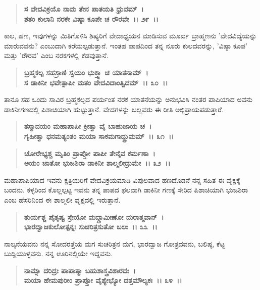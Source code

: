 \begin{verse}
\textbf{ಸ ವೇದವಿಕ್ರಯೊ ನಾಮ ತೇನ ಪಾತಯತಿ ಧ್ರುವಮ್~।}\\\textbf{ಶತಂ ಕುಲಾನಿ ನರಕೇ ವಿಷ್ಠಾ ಕೂಪೇ ಚ ರೌರವೇ~।। ೨೯~।।}
\end{verse}

ಕಾಲ, ಹಣ, ಇವುಗಳನ್ನು ಮಿತಿಗೊಳಿಸಿ ಶಿಷ್ಯರಿಗೆ ವೇದಾಧ್ಯಯನ ಮಾಡಿಸುವ ಮೂರ್ಖ ಬ್ರಾಹ್ಮಣನು 'ವೇದವಿದ್ಯೆಯನ್ನು ಮಾರುವವನು? ಎಂಬುದಾಗಿ ಕರೆಯಲ್ಪಡುತ್ತಾನೆ. ಇಂತಹ ಪಾಪದಿಂದ ತನ್ನ ನೂರು ಕುಲದವರನ್ನು, 'ವಿಷ್ಠಾ ಕೂಪ' ಮತ್ತು 'ರೌರವ' ಎಂಬ ನರಕಗಳಲ್ಲಿ ಕೆಡವುತ್ತಾನೆ.

\begin{verse}
\textbf{ಬ್ರಹ್ಮಕಲ್ಪ ಸಹಸ್ರಾಣಿ ಸ್ವಯಂ ಭುಕ್ತ್ವಾ ಚ ಯಾತನಾಮ್~।}\\\textbf{ಸ ಡಾಕಿನೀ ಭವೇತ್ಪಾಪೀ ಮತಂ ವೇದವಿದಾಂತ್ವಿದಮ್~।। ೩೦~।।}
\end{verse}

ತಾನೂ ಸಹ ಒಂದು ಸಾವಿರ ಬ್ರಹ್ಮಕಲ್ಪದ ಪರ್ಯಂತ ನರಕ ಯಾತನೆಯನ್ನು ಅನುಭವಿಸಿ ನಂತರ ಪಾಪಿಯಾದ ಅವನು ಡಾಕಿನೀಗಣದಲ್ಲಿ ಪಿಶಾಚಿಯಾಗಿ ಹುಟ್ಟುತ್ತಾನೆ. ವೇದಗಳನ್ನು ಬಲ್ಲವರು ಈ ರೀತಿ ಅಭಿಪ್ರಾಯಪಡುತ್ತಾರೆ.

\begin{verse}
\textbf{ತಸ್ಮಾದಯಂ ಮಹಾಪಾಪೀ ಕ್ರೀತ್ವಾ ವೈ ಬಾಹುಜಾಯ ಚ~।}\\\textbf{ಗೃಹೀತ್ವಾ ಧನಮತ್ಯಂತಂ ಮಯಾ ಸಾಕಮಗಾದ್ದ್ರುಮಮ್~।। ೩೧~।। }
\end{verse}

\begin{verse}
\textbf{ಚೋರೇಭ್ಯಶ್ಚ ಮೃತಿಂ ಪ್ರಾಪ್ತೋ ಪಾಪೀ ತೇನೈವ ಕರ್ಮಣಾ~।}\\\textbf{ಅಯಂ ಜಾತೋ ಭುಜಶಿರಾ ಡಾಕಿನೀ ಶಾಲ್ಮಲೀದ್ರುಮೇ~।। ೩೨~।।}
\end{verse}

ಮಹಾಪಾಪಿಯಾದ ಇವನು ಕ್ಷತ್ರಿಯರಿಗೆ ವೇದವಿಕ್ರಯಮಾಡಿ ವಿಪುಲವಾದ ಹಣದೊಡನೆ ನನ್ನ ಸಹಿತ ಈ ವೃಕ್ಷಕ್ಕೆ ಬಂದನು. ಕಳ್ಳರಿಂದ ಕೊಲ್ಲಲ್ಪಟ್ಟ ಇವನು ತನ್ನ ಪಾಪದ ಫಲವಾಗಿ ಡಾಕಿನೀ ಗಣಕ್ಕೆ ಸೇರಿದ ಪಿಶಾಚಿಯಾಗಿ ಭುಜಶಿರಾ ಎಂಬ ಹೆಸರಿನಿಂದ ಈ ಶಾಲ್ಮಲೀ ವೃಕ್ಷದಲ್ಲಿ ಇರುತ್ತಾನೆ.

\begin{verse}
\textbf{ತುರ್ಯಶ್ಚ ಪೈತೃಷ್ವ ಸ್ರೇಯೋ ಮದ್ಗ್ರಾಮೀಣೋ ದುರಾತ್ಮವಾನ್~।}\\\textbf{ಭಾರದ್ವಾಜಕುಲೋತ್ಪನ್ನಃ ಸುಚರಿತ್ರಸುತೋ ಬಲಃ~।। ೩೩~।।}
\end{verse}

ನಾಲ್ಕನೆಯವನು ನನ್ನ ಸೋದರತ್ತೆಯ ಮಗ ಸುಚರಿತ್ರನ ಮಗ, ಭಾರದ್ವಾಜ ಗೋತ್ರದವನು, ಬಲಿಷ್ಠ, ಕೆಟ್ಟ ಬುದ್ದಿಯುಳ್ಳವನು. ನನ್ನ ಊರಿನಲ್ಲಿಯೇ ಇದ್ದವನು.

\begin{verse}
\textbf{ನಾಮ್ನಾ ದರಿದ್ರಃ ಪಾಪಾತ್ಮಾ ಬಹುಶಾಸ್ತ್ರವಿಶಾರದಃ~।}\\\textbf{ಮಯಾ ಹೇಮಪುರೀಂ ಪ್ರಾಪ್ತೋ ವೈಶ್ಯೇಭ್ಯೋ ದತ್ತಮೌಲ್ಯಕಃ~।। ೩೪~।।} 
\end{verse}

